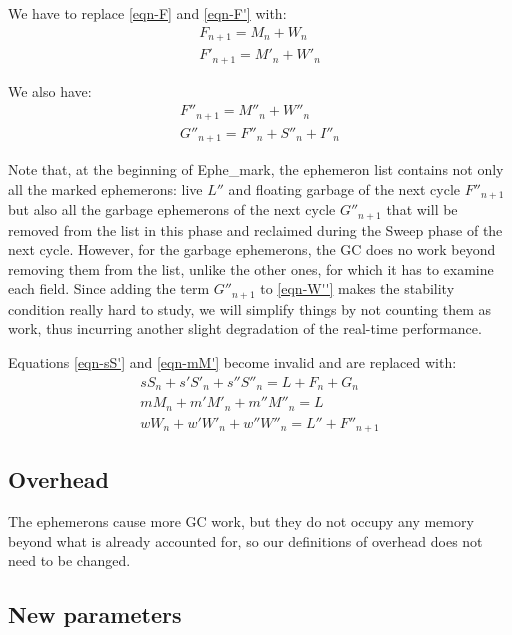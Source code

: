 \documentclass{article}
\begin{document}
We have to replace \eqref{eqn-F} and \eqref{eqn-F'} with:
\begin{gather}
F_{n+1} = M_n + W_n  \label{eqn-FW} \\
F'_{n+1} = M'_n + W'_n  \label{eqn-F'W}
\end{gather}

We also have:
\begin{gather}
F''_{n+1} = M''_n + W''_n  \label{eqn-F''} \\
G''_{n+1} = F''_n + S''_n + I''_n   \label{eqn-G''}
\end{gather}

Note that,
at the beginning of Ephe\_mark, the ephemeron list contains not only
all the marked ephemerons: live $L''$ and floating garbage of the next
cycle $F''_{n+1}$ but also all the garbage ephemerons of the next
cycle $G''_{n+1}$ that will be removed from the list in this phase
and reclaimed
during the Sweep phase of the next cycle. However, for the garbage
ephemerons, the GC does no work beyond removing them from the list,
unlike the other ones, for which it has to examine each field. Since
adding the term $G''_{n+1}$ to \eqref{eqn-W''} makes the stability
condition really hard
to study, we will simplify things by not counting them as work, thus
incurring another slight degradation of the real-time performance.

Equations
\eqref{eqn-sS'} and \eqref{eqn-mM'} become invalid and are replaced with:
\begin{gather}
sS_n + s'S'_n + s''S''_n = L + F_n + G_n \label{eqn-sS''}  \\
mM_n + m'M'_n + m''M''_n = L  \label{eqn-mM''} \\
wW_n + w'W'_n + w''W''_n = L'' + F''_{n+1}  \label{eqn-wW''}
\end{gather}


\subsection{Overhead}

The ephemerons cause more GC work, but they do not occupy any memory
beyond what is already accounted for, so our definitions of overhead
does not need to be changed.

\subsection{New parameters}
\end{document}
